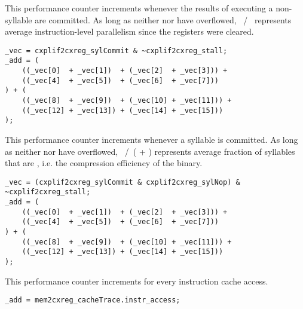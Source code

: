 This performance counter increments whenever the results of executing a 
non- syllable are committed. As long as neither  nor 
 have overflowed, ~/~ represents average 
instruction-level parallelism since the registers were cleared.

\declaration{}
\implementation{}
\begin{lstlisting}
_vec = cxplif2cxreg_sylCommit & ~cxplif2cxreg_stall;
_add = (
    ((_vec[0]  + _vec[1])  + (_vec[2]  + _vec[3])) +
    ((_vec[4]  + _vec[5])  + (_vec[6]  + _vec[7]))
) + (
    ((_vec[8]  + _vec[9])  + (_vec[10] + _vec[11])) +
    ((_vec[12] + _vec[13]) + (_vec[14] + _vec[15]))
);
\end{lstlisting}


This performance counter increments whenever a  syllable is committed. 
As long as neither  nor  have overflowed, 
~/~( + ) represents average fraction of syllables 
that are , i.e. the compression efficiency of the binary.

\declaration{}
\implementation{}
\begin{lstlisting}
_vec = (cxplif2cxreg_sylCommit & cxplif2cxreg_sylNop) & ~cxplif2cxreg_stall;
_add = (
    ((_vec[0]  + _vec[1])  + (_vec[2]  + _vec[3])) +
    ((_vec[4]  + _vec[5])  + (_vec[6]  + _vec[7]))
) + (
    ((_vec[8]  + _vec[9])  + (_vec[10] + _vec[11])) +
    ((_vec[12] + _vec[13]) + (_vec[14] + _vec[15]))
);
\end{lstlisting}


This performance counter increments for every instruction cache access.

\implementation{}
\begin{lstlisting}
_add = mem2cxreg_cacheTrace.instr_access;
\end{lstlisting}

